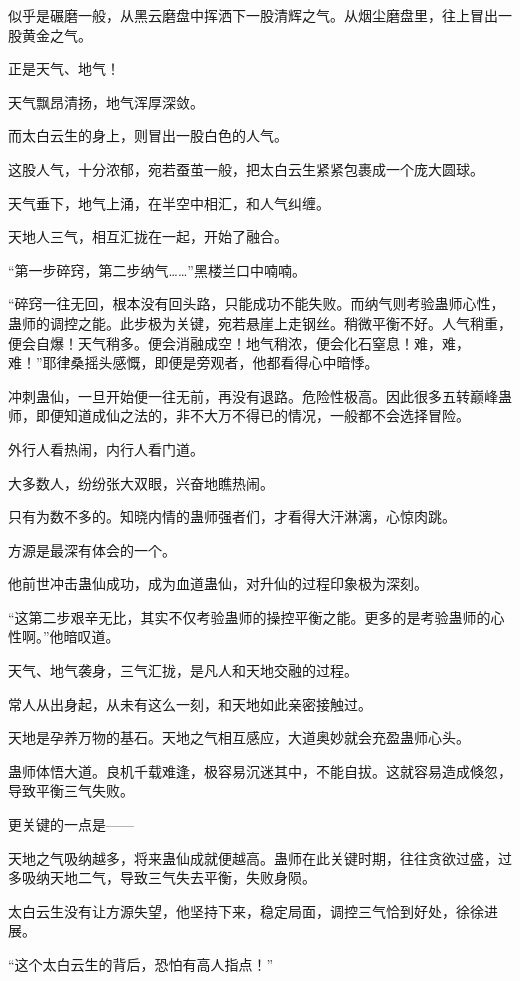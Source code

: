 \begin{this_body}
似乎是碾磨一般，从黑云磨盘中挥洒下一股清辉之气。从烟尘磨盘里，往上冒出一股黄金之气。

正是天气、地气！

天气飘昂清扬，地气浑厚深敛。

而太白云生的身上，则冒出一股白色的人气。

这股人气，十分浓郁，宛若蚕茧一般，把太白云生紧紧包裹成一个庞大圆球。

天气垂下，地气上涌，在半空中相汇，和人气纠缠。

天地人三气，相互汇拢在一起，开始了融合。

“第一步碎窍，第二步纳气……”黑楼兰口中喃喃。

“碎窍一往无回，根本没有回头路，只能成功不能失败。而纳气则考验蛊师心性，蛊师的调控之能。此步极为关键，宛若悬崖上走钢丝。稍微平衡不好。人气稍重，便会自爆！天气稍多。便会消融成空！地气稍浓，便会化石窒息！难，难，难！”耶律桑摇头感慨，即便是旁观者，他都看得心中暗悸。

冲刺蛊仙，一旦开始便一往无前，再没有退路。危险性极高。因此很多五转巅峰蛊师，即便知道成仙之法的，非不大万不得已的情况，一般都不会选择冒险。

外行人看热闹，内行人看门道。

大多数人，纷纷张大双眼，兴奋地瞧热闹。

只有为数不多的。知晓内情的蛊师强者们，才看得大汗淋漓，心惊肉跳。

方源是最深有体会的一个。

他前世冲击蛊仙成功，成为血道蛊仙，对升仙的过程印象极为深刻。

“这第二步艰辛无比，其实不仅考验蛊师的操控平衡之能。更多的是考验蛊师的心性啊。”他暗叹道。

天气、地气袭身，三气汇拢，是凡人和天地交融的过程。

常人从出身起，从未有这么一刻，和天地如此亲密接触过。

天地是孕养万物的基石。天地之气相互感应，大道奥妙就会充盈蛊师心头。

蛊师体悟大道。良机千载难逢，极容易沉迷其中，不能自拔。这就容易造成倏忽，导致平衡三气失败。

更关键的一点是——

天地之气吸纳越多，将来蛊仙成就便越高。蛊师在此关键时期，往往贪欲过盛，过多吸纳天地二气，导致三气失去平衡，失败身陨。

太白云生没有让方源失望，他坚持下来，稳定局面，调控三气恰到好处，徐徐进展。

“这个太白云生的背后，恐怕有高人指点！”


\end{this_body}
